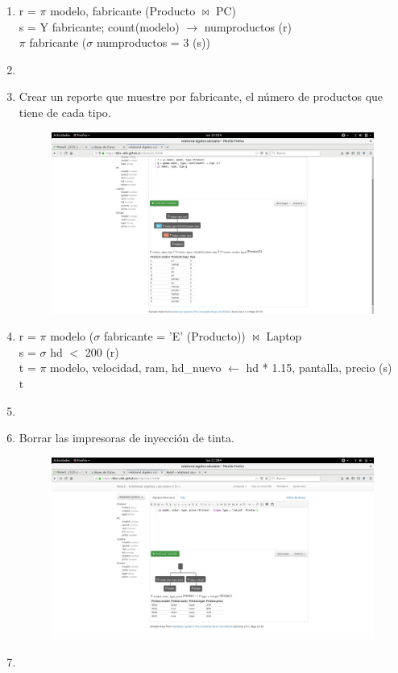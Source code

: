 \documentclass[a4paper, 12pt]{report}
\begin{document}
{\begin{enumerate}[label=\alph*)]
{\begin{figure}[H]
            {img/k.png}\hfill
    \end{figure}
}
\item{r = $\pi$ modelo, fabricante (Producto $\Join$ PC)\\
s = Y fabricante; count(modelo) $\rightarrow$ numproductos (r)\\
$\pi$ fabricante ($\sigma$ numproductos = 3 (s))}
\item{}
\item{Crear un reporte que muestre por fabricante, el número de productos que tiene de cada tipo.\\
    \begin{figure}[H]
        \includegraphics[width=\textwidth]
            {img/n.png}\hfill
    \end{figure}
}
\item{r = $\pi$ modelo ($\sigma$ fabricante = 'E' (Producto)) $\Join$ Laptop\\
s = $\sigma$ hd $<$ 200 (r)\\
t = $\pi$ modelo, velocidad, ram, hd\_nuevo $\leftarrow$ hd * 1.15, pantalla, precio (s)\\
t}
\item{}
\item{Borrar las impresoras de inyección de tinta.\\
    \begin{figure}[H]
        \includegraphics[width=\textwidth]
            {img/p.png}\hfill
    \end{figure}}
\item{}
\end{enumerate}
}
\end{document}
